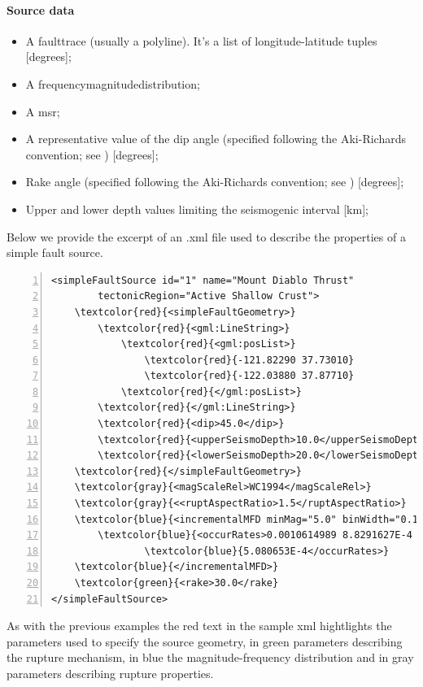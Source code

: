 \paragraph{Source data}
%
\begin{itemize}
\item A \gls{faulttrace} (usually a polyline). It's a list of 
	longitude-latitude tuples [degrees]; 
\item A \gls{frequencymagnitudedistribution};
\item A \gls{msr};
\item A representative value of the dip angle (specified following 
the Aki-Richards convention; see \citet{aki2002}) [degrees];
\item Rake angle (spec\-i\-fied following the Aki-Rich\-ards convention; 
see \citet{aki2002}) [degrees]; 
\item Upper and lower depth values limiting the seismogenic interval [km]; 
\end{itemize} 
Below we provide the excerpt of an .xml file used to describe the 
properties of a simple fault source.
\begin{Verbatim}[frame=single, commandchars=\\\{\}, fontsize=\footnotesize,
    numbers=left, numbersep=2pt]
<simpleFaultSource id="1" name="Mount Diablo Thrust" 
		tectonicRegion="Active Shallow Crust">
    \textcolor{red}{<simpleFaultGeometry>}
        \textcolor{red}{<gml:LineString>}
            \textcolor{red}{<gml:posList>}
                \textcolor{red}{-121.82290 37.73010}
                \textcolor{red}{-122.03880 37.87710}
            \textcolor{red}{</gml:posList>}
        \textcolor{red}{</gml:LineString>}
        \textcolor{red}{<dip>45.0</dip>}
        \textcolor{red}{<upperSeismoDepth>10.0</upperSeismoDepth>}
        \textcolor{red}{<lowerSeismoDepth>20.0</lowerSeismoDepth>}
    \textcolor{red}{</simpleFaultGeometry>}
    \textcolor{gray}{<magScaleRel>WC1994</magScaleRel>}
    \textcolor{gray}{<<ruptAspectRatio>1.5</ruptAspectRatio>}
    \textcolor{blue}{<incrementalMFD minMag="5.0" binWidth="0.1">}
        \textcolor{blue}{<occurRates>0.0010614989 8.8291627E-4 7.3437777E-4 6.108288E-4 }
				\textcolor{blue}{5.080653E-4</occurRates>}
    \textcolor{blue}{</incrementalMFD>}
    \textcolor{green}{<rake>30.0</rake}
</simpleFaultSource>
\end{Verbatim}
\label{example_incremental_mfd}
As with the previous examples the red text in the sample xml hightlights 
the parameters used to specify the source geometry, in green parameters 
describing the rupture mechanism, in blue the magnitude-frequency 
distribution and in gray parameters describing rupture properties. 
%

